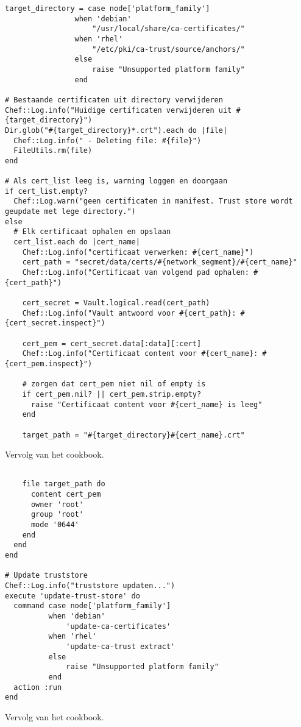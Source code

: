 \begin{listing}[H]\ContinuedFloat
\begin{verbatim}
target_directory = case node['platform_family']
                when 'debian'
                    "/usr/local/share/ca-certificates/"
                when 'rhel'
                    "/etc/pki/ca-trust/source/anchors/"
                else
                    raise "Unsupported platform family"
                end

# Bestaande certificaten uit directory verwijderen
Chef::Log.info("Huidige certificaten verwijderen uit #{target_directory}")
Dir.glob("#{target_directory}*.crt").each do |file|
  Chef::Log.info(" - Deleting file: #{file}")
  FileUtils.rm(file)
end

# Als cert_list leeg is, warning loggen en doorgaan
if cert_list.empty?
  Chef::Log.warn("geen certificaten in manifest. Trust store wordt geupdate met lege directory.")
else
  # Elk certificaat ophalen en opslaan
  cert_list.each do |cert_name|
    Chef::Log.info("certificaat verwerken: #{cert_name}")
    cert_path = "secret/data/certs/#{network_segment}/#{cert_name}"
    Chef::Log.info("Certificaat van volgend pad ophalen: #{cert_path}")

    cert_secret = Vault.logical.read(cert_path)
    Chef::Log.info("Vault antwoord voor #{cert_path}: #{cert_secret.inspect}")

    cert_pem = cert_secret.data[:data][:cert]
    Chef::Log.info("Certificaat content voor #{cert_name}: #{cert_pem.inspect}")

    # zorgen dat cert_pem niet nil of empty is
    if cert_pem.nil? || cert_pem.strip.empty?
      raise "Certificaat content voor #{cert_name} is leeg"
    end

    target_path = "#{target_directory}#{cert_name}.crt"

\end{verbatim}
\caption[]{Vervolg van het cookbook.}
\end{listing}

\begin{listing}[H]\ContinuedFloat
\begin{verbatim}

    file target_path do
      content cert_pem
      owner 'root'
      group 'root'
      mode '0644'
    end
  end
end

# Update truststore
Chef::Log.info("truststore updaten...")
execute 'update-trust-store' do
  command case node['platform_family']
          when 'debian'
              'update-ca-certificates'
          when 'rhel'
              'update-ca-trust extract'
          else
              raise "Unsupported platform family"
          end
  action :run
end

\end{verbatim}
\caption[]{Vervolg van het cookbook.}
\end{listing}


